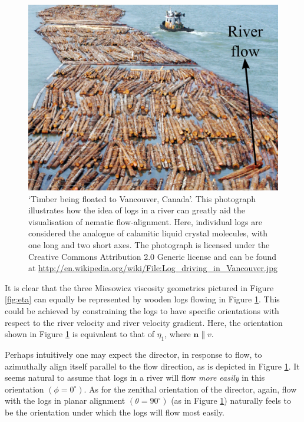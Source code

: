 \begin{figure}
\begin{center}
\includegraphics{Figures/Theory/river}
\end{center}
\caption[`Timber being floated to Vancouver, Canada']{\label{fig:logging} `Timber being floated to Vancouver, Canada'. This photograph illustrates how the idea of logs in a river can greatly aid the visualisation of nematic flow-alignment. Here, individual logs are considered the analogue of calamitic liquid crystal molecules, with one long and two short axes. The photograph is licensed under the Creative Commons Attribution 2.0 Generic license and can be found at \href{http://en.wikipedia.org/wiki/File:Log_driving_in_Vancouver.jpg}{http://en.wikipedia.org/wiki/File:Log\_driving\_in\_Vancouver.jpg}}
\end{figure}

It is clear that the three Miesowicz viscosity geometries pictured in Figure \ref{fig:eta} can equally be represented by wooden logs flowing in Figure \ref{fig:logging}. This could be achieved by constraining the logs to have specific orientations with respect to the river velocity and river velocity gradient. Here, the orientation shown in Figure \ref{fig:logging} is equivalent to that of $\eta_1$, where $\mathbf{n}\parallel v$. 

Perhaps intuitively one may expect the director, in response to flow, to azimuthally align itself parallel to the flow direction, as is depicted in Figure \ref{fig:logging}. It seems natural to assume that logs in a river will flow \textit{more easily} in this orientation $\left(\phi=0^{\circ}\right)$. As for the zenithal orientation of the director, again, flow with the logs in planar alignment $\left(\theta=90^{\circ}\right)$ (as in Figure \ref{fig:logging}) naturally feels to be the orientation under which the logs will flow most easily.

